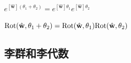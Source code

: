 \documentclass[12pt, a4paper, article, UTF8]{ctexart}
\begin{document}
\begin{mytheorem}
$e^{[\hat{\mathbf{w}}](\theta_1 + \theta_2)} =e^{[\hat{\mathbf{w}}]\theta_1 }e^{[\hat{\mathbf{w}}]\theta_2 }$
\end{mytheorem}

\begin{mytheorem}
$\textnormal{Rot}(\hat{\mathbf{w}}, \theta_1+\theta_2)=  \textnormal{Rot}(\hat{\mathbf{w}}, \theta_1)\textnormal{Rot}(\hat{\mathbf{w}}, \theta_2)$
\end{mytheorem}
\subsection{李群和李代数}
\end{document}
